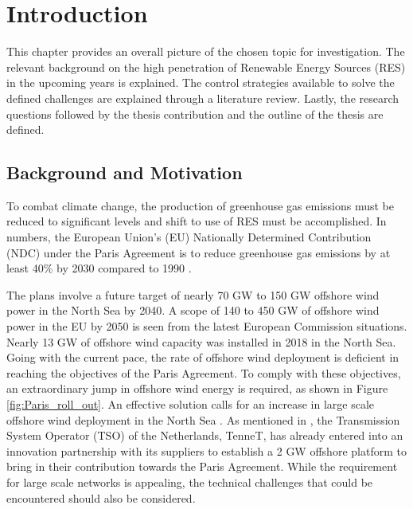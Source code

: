 \chapter{Introduction}\label{1}

This chapter provides an overall picture of the chosen topic for investigation. The relevant background on the high penetration of Renewable Energy Sources (\gls{RES}) in the upcoming years is explained. The control strategies available to solve the defined challenges are explained through a literature review. Lastly, the research questions followed by the thesis contribution and the outline of the thesis are defined. 

\section{Background and Motivation}\label{Background}

To combat climate change, the production of greenhouse gas emissions must be reduced to significant levels and shift to use of \gls{RES} must be accomplished. In numbers, the European Union's (\gls{EU}) Nationally Determined Contribution (NDC) under the Paris Agreement is to reduce greenhouse gas emissions by at least 40\% by 2030 compared to 1990 \cite{agreement2015unfccc}. 

The plans involve a future target of nearly 70 GW to 150 GW offshore wind power in the North Sea by 2040. A scope of 140 to 450 GW of offshore wind power in the \gls{EU} by 2050 is seen from the latest European Commission situations. Nearly 13 GW of offshore wind capacity was installed in 2018 in the North Sea. Going with the current pace, the rate of offshore wind deployment is deficient in reaching the objectives of the Paris Agreement. To comply with these objectives, an extraordinary jump in offshore wind energy is required, as shown in Figure \ref{fig:Paris_roll_out}. An effective solution calls for an increase in large scale offshore wind deployment in the North Sea \cite{noauthor_vision_nodate}. As mentioned in \cite{noauthor_tennet_2020}, the Transmission System Operator (TSO) of the Netherlands, TenneT, has already entered into an innovation partnership with its suppliers to establish a 2 GW offshore platform to bring in their contribution towards the Paris Agreement. While the requirement for large scale networks is appealing, the technical challenges that could be encountered should also be considered.  

